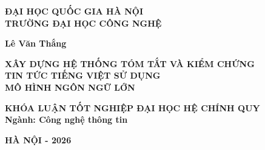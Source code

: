 \begin{titlepage}
\begin{center}

{\fontsize{12pt}{14pt}\selectfont\bfseries
ĐẠI HỌC QUỐC GIA HÀ NỘI \\
TRƯỜNG ĐẠI HỌC CÔNG NGHỆ}

\vspace{1.5cm}


\vspace{1.5cm}

{\fontsize{14pt}{16pt}\selectfont\bfseries
Lê Văn Thắng}

\vspace{3cm}

{\fontsize{18pt}{22pt}\selectfont\bfseries
XÂY DỰNG HỆ THỐNG TÓM TẮT VÀ KIỂM CHỨNG \\
TIN TỨC TIẾNG VIỆT SỬ DỤNG \\
MÔ HÌNH NGÔN NGỮ LỚN}

\vspace{3cm}

{\fontsize{14pt}{16pt}\selectfont\bfseries
KHÓA LUẬN TỐT NGHIỆP ĐẠI HỌC HỆ CHÍNH QUY \\[0.5cm]
Ngành: Công nghệ thông tin}

\vfill

{\fontsize{12pt}{14pt}\selectfont\bfseries
HÀ NỘI - 2026}

\end{center}
\end{titlepage}
